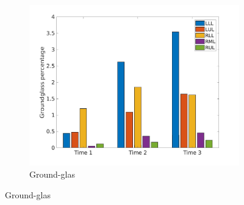 \begin{figure}[H] 
\centering
\begin{subfigure}{.46\linewidth}%
  \includegraphics[width=\linewidth,trim={{.0\wd0} {.0\wd0} {.0\wd0} {.0\wd0}},clip]{QuantitativeAnalysis/Image/IPF15GroundglassLobarRegionDiseaseDistributionOverTime.jpg} %
  \caption{Ground-glas}
  \label{fig:IPF15LobarRegionDiseaseDistributionOverTimeMain-a} 
\end{subfigure} 
\hspace{.3in}

\end{figure}
